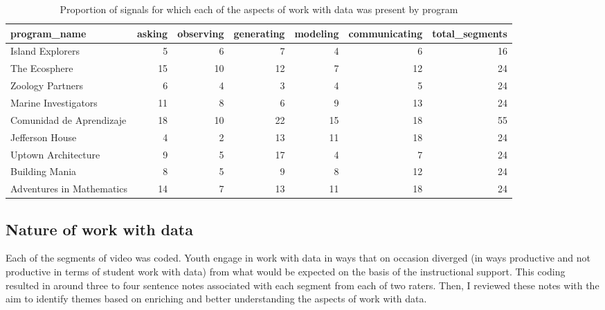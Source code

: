 \documentclass[]{msu-thesis}
\theoremstyle{definition}
\theoremstyle{definition}
\theoremstyle{definition}
\theoremstyle{remark}
\begin{document}
\begin{landscape}\begin{table}

\caption{\label{tab:unnamed-chunk-9}Proportion of signals for which each of the aspects of work with data was present by program}
\centering
\begin{tabular}[t]{lrrrrrr}
\toprule
program\_name & asking & observing & generating & modeling & communicating & total\_segments\\
\midrule
Island Explorers & 5 & 6 & 7 & 4 & 6 & 16\\
The Ecosphere & 15 & 10 & 12 & 7 & 12 & 24\\
Zoology Partners & 6 & 4 & 3 & 4 & 5 & 24\\
Marine Investigators & 11 & 8 & 6 & 9 & 13 & 24\\
Comunidad de Aprendizaje & 18 & 10 & 22 & 15 & 18 & 55\\
Jefferson House & 4 & 2 & 13 & 11 & 18 & 24\\
Uptown Architecture & 9 & 5 & 17 & 4 & 7 & 24\\
Building Mania & 8 & 5 & 9 & 8 & 12 & 24\\
Adventures in Mathematics & 14 & 7 & 13 & 11 & 18 & 24\\
\bottomrule
\end{tabular}
\end{table}
\end{landscape}

\subsection{Nature of work with data}\label{nature-of-work-with-data}

Each of the segments of video was coded. Youth engage in work with data
in ways that on occasion diverged (in ways productive and not productive
in terms of student work with data) from what would be expected on the
basis of the instructional support. This coding resulted in around three
to four sentence notes associated with each segment from each of two
raters. Then, I reviewed these notes with the aim to identify themes
based on enriching and better understanding the aspects of work with
data.
\end{document}
